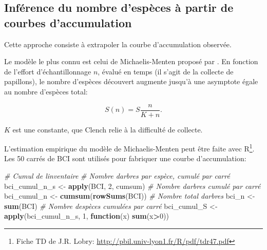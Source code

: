 \documentclass[
  11pt,
  american,
  a4paper,
  extrafontsizes,onecolumn,openright
  ]{memoir}
\newenvironment{Shaded}{\begin{snugshade}}{\end{snugshade}}
\newcommand{\CommentTok}[1]{\textcolor[rgb]{0.56,0.35,0.01}{\textit{#1}}}
\newcommand{\ControlFlowTok}[1]{\textcolor[rgb]{0.13,0.29,0.53}{\textbf{#1}}}
\newcommand{\DecValTok}[1]{\textcolor[rgb]{0.00,0.00,0.81}{#1}}
\newcommand{\FunctionTok}[1]{\textcolor[rgb]{0.13,0.29,0.53}{\textbf{#1}}}
\newcommand{\NormalTok}[1]{#1}
\newcommand{\OtherTok}[1]{\textcolor[rgb]{0.56,0.35,0.01}{#1}}
\newcommand{\SpecialCharTok}[1]{\textcolor[rgb]{0.81,0.36,0.00}{\textbf{#1}}}
\begin{document}
\normalsize

\subsection{Inférence du nombre d'espèces à partir de courbes d'accumulation}\label{sec-RichesseSAC}

Cette approche consiste à extrapoler la courbe d'accumulation observée.

Le modèle le plus connu est celui de Michaelis-Menten \autocite{Michaelis1913} proposé par \textcite{Clench1979}.
En fonction de l'effort d'échantillonnage \(n\), évalué en temps (il s'agit de la collecte de papillons), le nombre d'espèces découvert augmente jusqu'à une asymptote égale au nombre d'espèces total:

\begin{equation} 
  S(n) = S\frac{n}{K + n}.
\end{equation}

\(K\) est une constante, que Clench relie à la difficulté de collecte.

L'estimation empirique du modèle de Michaelis-Menten peut être faite avec R\footnote{ Fiche TD de J.R. Lobry: \url{http://pbil.univ-lyon1.fr/R/pdf/tdr47.pdf}}.
Les 50 carrés de BCI sont utilisés pour fabriquer une courbe d'accumulation:

\scriptsize

\begin{Shaded}
\begin{Highlighting}[]
\CommentTok{\# Cumul de l\textquotesingle{}inventaire}
\CommentTok{\# Nombre d\textquotesingle{}arbres par espèce, cumulé par carré}
\NormalTok{bci\_cumul\_n\_s }\OtherTok{\textless{}{-}} \FunctionTok{apply}\NormalTok{(BCI, }\DecValTok{2}\NormalTok{, cumsum)}
\CommentTok{\# Nombre d\textquotesingle{}arbres cumulé par carré}
\NormalTok{bci\_cumul\_n }\OtherTok{\textless{}{-}} \FunctionTok{cumsum}\NormalTok{(}\FunctionTok{rowSums}\NormalTok{(BCI))}
\CommentTok{\# Nombre total d\textquotesingle{}arbres}
\NormalTok{bci\_n }\OtherTok{\textless{}{-}} \FunctionTok{sum}\NormalTok{(BCI)}
\CommentTok{\# Nombre d\textquotesingle{}espèces cumulées par carré}
\NormalTok{bci\_cumul\_S }\OtherTok{\textless{}{-}} \FunctionTok{apply}\NormalTok{(bci\_cumul\_n\_s, }\DecValTok{1}\NormalTok{, }\ControlFlowTok{function}\NormalTok{(x) }\FunctionTok{sum}\NormalTok{(x}\SpecialCharTok{\textgreater{}}\DecValTok{0}\NormalTok{))}
\end{Highlighting}
\end{Shaded}
\end{document}
